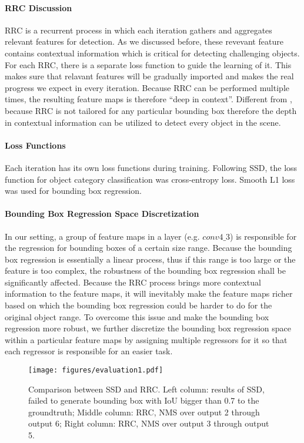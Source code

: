 \documentclass[10pt,twocolumn,letterpaper]{article}
\begin{document}
\paragraph{RRC Discussion}
RRC is a recurrent process in which each iteration gathers and aggregates relevant features for detection. As we discussed before, these revevant feature contains contextual information which is critical for detecting challenging objects. For each RRC, there is a separate loss function to guide the learning of it. This makes sure that relavant features will be gradually imported and makes the real progress we expect in every iteration. Because RRC can be performed multiple times, the resulting feature maps is therefore ``deep in context''. Different from \cite{Stewart16}, because RRC is not tailored for any particular bounding box therefore the depth in contextual information can be utilized to detect every object in the scene.

\paragraph{Loss Functions}
Each iteration has its own loss functions during training. Following SSD, the loss function for object category classification was cross-entropy loss. Smooth L1 loss was used for bounding box regression.

\paragraph{Bounding Box Regression Space Discretization}
In our setting, a group of feature maps in a layer (e.g. $conv4\_3$) is responsible for the regression for bounding boxes of a certain size range. Because the bounding box regression is essentially a linear process, thus if this range is too large or the feature is too complex, the robustness of the bounding box regression shall be significantly affected. Because the RRC process brings more contextual information to the feature maps, it will inevitably make the feature maps richer based on which the bounding box regression could be harder to do for the original object range. To overcome this issue and make the bounding box regression more robust, we further discretize the bounding box regression space within a particular feature maps by assigning multiple regressors for it so that each regressor is responsible for an easier task.

\begin{figure}
  \centering
  \texttt{[image: figures/evaluation1.pdf]}
  \caption{Comparison between SSD and RRC. Left column: results of SSD, failed to generate bounding box with IoU bigger than 0.7 to the groundtruth; Middle column: RRC, NMS over output 2 through output 6; Right column: RRC, NMS over output 3 through output 5. }
  \label{fig:evaluation1}
  \vskip -0.2in
\end{figure}
\end{document}
